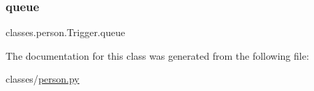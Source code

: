 \mbox{\label{classclasses_1_1person_1_1Trigger_aaaed8678cd8cec7d6037b83fa6163bf5}} 
\subsubsection{\texorpdfstring{queue}{queue}}
{\footnotesize\ttfamily classes.\+person.\+Trigger.\+queue}



The documentation for this class was generated from the following file\+:\begin{DoxyCompactItemize}
\item 
classes/\hyperlink{person_8py}{person.\+py}\end{DoxyCompactItemize}
